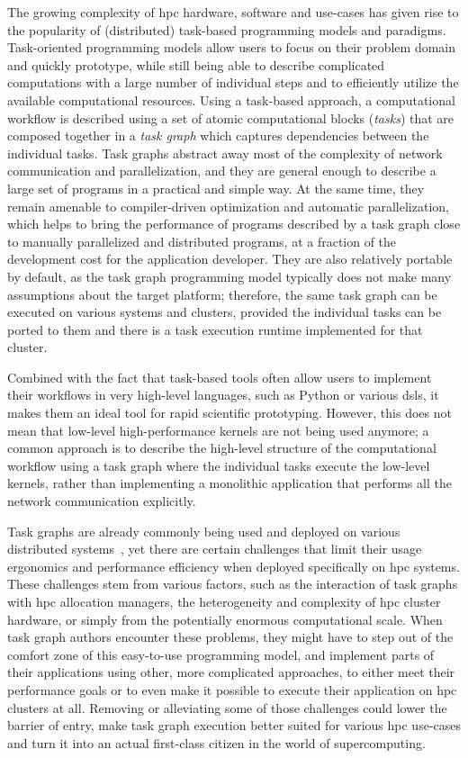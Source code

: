 The growing complexity of \gls{hpc} hardware, software and use-cases has given rise to
the popularity of (distributed) task-based programming models and paradigms. Task-oriented
programming models allow users to focus on their problem domain and quickly prototype, while still
being able to describe complicated computations with a large number of individual steps and to
efficiently utilize the available computational resources. Using a task-based approach, a
computational workflow is described using a set of atomic computational blocks
(\emph{tasks}) that are composed together in a \emph{task graph} which captures
dependencies between the individual tasks. Task graphs abstract away most of the complexity of
network communication and parallelization, and they are general enough to describe a large set of
programs in a practical and simple way. At the same time, they remain amenable to compiler-driven
optimization and automatic parallelization, which helps to bring the performance of programs
described by a task graph close to manually parallelized and distributed programs, at a fraction of
the development cost for the application developer. They are also relatively portable by default,
as the task graph programming model typically does not make many assumptions about the target
platform; therefore, the same task graph can be executed on various systems and clusters, provided
the individual tasks can be ported to them and there is a task execution runtime implemented for
that cluster.

Combined with the fact that task-based tools often allow users to implement their workflows in very
high-level languages, such as Python or various \glspl{dsl}, it makes them an ideal tool
for rapid scientific prototyping. However, this does not mean that low-level high-performance
kernels are not being used anymore; a common approach is to describe the high-level structure of
the computational workflow using a task graph where the individual tasks execute the low-level
kernels, rather than implementing a monolithic application that performs all the network
communication explicitly.

Task graphs are already commonly being used and deployed on various distributed
systems~\cite{pegasus, workflows_at_scale, large_scale_modelling}, yet there are certain challenges that limit their usage ergonomics
and performance efficiency when deployed specifically on \gls{hpc} systems. These
challenges stem from various factors, such as the interaction of task graphs with
\gls{hpc} allocation managers, the heterogeneity and complexity of
\gls{hpc} cluster hardware, or simply from the potentially enormous computational
scale. When task graph authors encounter these problems, they might have to step out of the comfort
zone of this easy-to-use programming model, and implement parts of their applications using other,
more complicated approaches, to either meet their performance goals or to even make it possible to
execute their application on \gls{hpc} clusters at all. Removing or alleviating some
of those challenges could lower the barrier of entry, make task graph execution better suited for
various \gls{hpc} use-cases and turn it into an actual first-class citizen in the
world of supercomputing\@.

